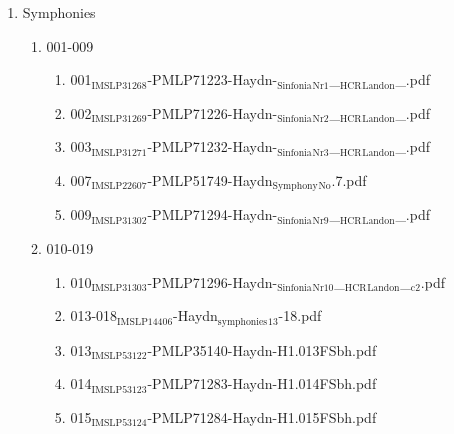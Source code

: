 \documentclass[11pt]{article}
\begin{document}
\begin{enumerate}
\item Symphonies
\label{sec-1-1-1-1-44-38-7}
\begin{enumerate}
\item 001-009
\label{sec-1-1-1-1-44-38-7-1}
\begin{enumerate}
\item 001$_{\text{IMSLP31268}}$-PMLP71223-Haydn-$_{\text{Sinfonia}}$$_{\text{Nr1}}$\_$_{\text{HCR}}$$_{\text{Landon}}$\_.pdf
\label{sec-1-1-1-1-44-38-7-1-1}

\item 002$_{\text{IMSLP31269}}$-PMLP71226-Haydn-$_{\text{Sinfonia}}$$_{\text{Nr2}}$\_$_{\text{HCR}}$$_{\text{Landon}}$\_.pdf
\label{sec-1-1-1-1-44-38-7-1-2}

\item 003$_{\text{IMSLP31271}}$-PMLP71232-Haydn-$_{\text{Sinfonia}}$$_{\text{Nr3}}$\_$_{\text{HCR}}$$_{\text{Landon}}$\_.pdf
\label{sec-1-1-1-1-44-38-7-1-3}

\item 007$_{\text{IMSLP22607}}$-PMLP51749-Haydn$_{\text{Symphony}}$$_{\text{No}}$.7.pdf
\label{sec-1-1-1-1-44-38-7-1-4}

\item 009$_{\text{IMSLP31302}}$-PMLP71294-Haydn-$_{\text{Sinfonia}}$$_{\text{Nr9}}$\_$_{\text{HCR}}$$_{\text{Landon}}$\_.pdf
\label{sec-1-1-1-1-44-38-7-1-5}
\end{enumerate}

\item 010-019
\label{sec-1-1-1-1-44-38-7-2}
\begin{enumerate}
\item 010$_{\text{IMSLP31303}}$-PMLP71296-Haydn-$_{\text{Sinfonia}}$$_{\text{Nr10}}$\_$_{\text{HCR}}$$_{\text{Landon}}$\_$_{\text{c2}}$.pdf
\label{sec-1-1-1-1-44-38-7-2-1}

\item 013-018$_{\text{IMSLP14406}}$-Haydn$_{\text{symphonies}}$$_{\text{13}}$-18.pdf
\label{sec-1-1-1-1-44-38-7-2-2}

\item 013$_{\text{IMSLP53122}}$-PMLP35140-Haydn-H1.013FSbh.pdf
\label{sec-1-1-1-1-44-38-7-2-3}

\item 014$_{\text{IMSLP53123}}$-PMLP71283-Haydn-H1.014FSbh.pdf
\label{sec-1-1-1-1-44-38-7-2-4}

\item 015$_{\text{IMSLP53124}}$-PMLP71284-Haydn-H1.015FSbh.pdf
\label{sec-1-1-1-1-44-38-7-2-5}


\end{enumerate}
\end{enumerate}
\end{enumerate}
\end{document}
